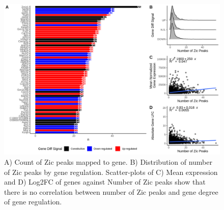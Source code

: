 \documentclass[fleqn,10pt,twocolumn]{wlscirep}
\begin{document}
\begin{figure}[ht]
\centering
\includegraphics[width=.90\linewidth]{Figures/supp_figure3.png}
\caption{ A) Count of Zic peaks mapped to gene. B) Distribution of number of Zic peaks by gene regulation.  Scatter-plots of C) Mean expression and D) Log2FC of genes against Number of Zic peaks show that there is no correlation between number of Zic peaks and gene degree of gene regulation. }
\label{fig:nPeakstoGenes}
\end{figure}
\end{document}
